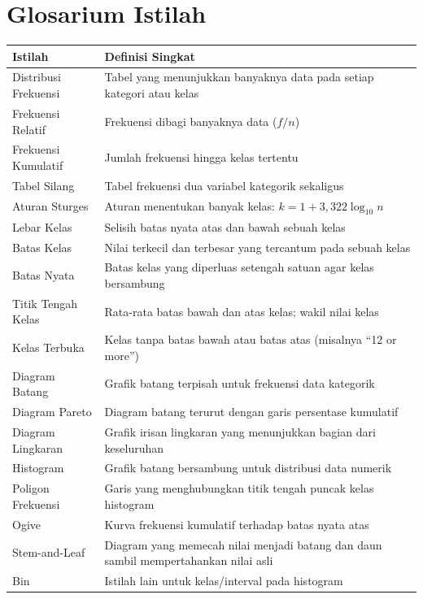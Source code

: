 \documentclass[
  indonesian,
  letterpaper,
]{book}
\newcounter{none} %
\begin{document}
\section{Glosarium Istilah}\label{glosarium-istilah-3}

{\def\LTcaptype{none} %
\begin{longtable}[]{@{}
  >{\raggedright\arraybackslash}p{}
  >{\raggedright\arraybackslash}p{}@{}}
\toprule\noalign{}
\begin{minipage}[b]{\linewidth}\raggedright
Istilah
\end{minipage} & \begin{minipage}[b]{\linewidth}\raggedright
Definisi Singkat
\end{minipage} \\
\midrule\noalign{}
\endhead
\bottomrule\noalign{}
\endlastfoot
Distribusi Frekuensi & Tabel yang menunjukkan banyaknya data pada setiap
kategori atau kelas \\
Frekuensi Relatif & Frekuensi dibagi banyaknya data (\(f/n\)) \\
Frekuensi Kumulatif & Jumlah frekuensi hingga kelas tertentu \\
Tabel Silang & Tabel frekuensi dua variabel kategorik sekaligus \\
Aturan Sturges & Aturan menentukan banyak kelas:
\(k = 1 + 3,322 \log_{10} n\) \\
Lebar Kelas & Selisih batas nyata atas dan bawah sebuah kelas \\
Batas Kelas & Nilai terkecil dan terbesar yang tercantum pada sebuah
kelas \\
Batas Nyata & Batas kelas yang diperluas setengah satuan agar kelas
bersambung \\
Titik Tengah Kelas & Rata-rata batas bawah dan atas kelas; wakil nilai
kelas \\
Kelas Terbuka & Kelas tanpa batas bawah atau batas atas (misalnya ``12
or more'') \\
Diagram Batang & Grafik batang terpisah untuk frekuensi data
kategorik \\
Diagram Pareto & Diagram batang terurut dengan garis persentase
kumulatif \\
Diagram Lingkaran & Grafik irisan lingkaran yang menunjukkan bagian dari
keseluruhan \\
Histogram & Grafik batang bersambung untuk distribusi data numerik \\
Poligon Frekuensi & Garis yang menghubungkan titik tengah puncak kelas
histogram \\
Ogive & Kurva frekuensi kumulatif terhadap batas nyata atas \\
Stem-and-Leaf & Diagram yang memecah nilai menjadi batang dan daun
sambil mempertahankan nilai asli \\
Bin & Istilah lain untuk kelas/interval pada histogram \\
\end{longtable}
}
\end{document}
